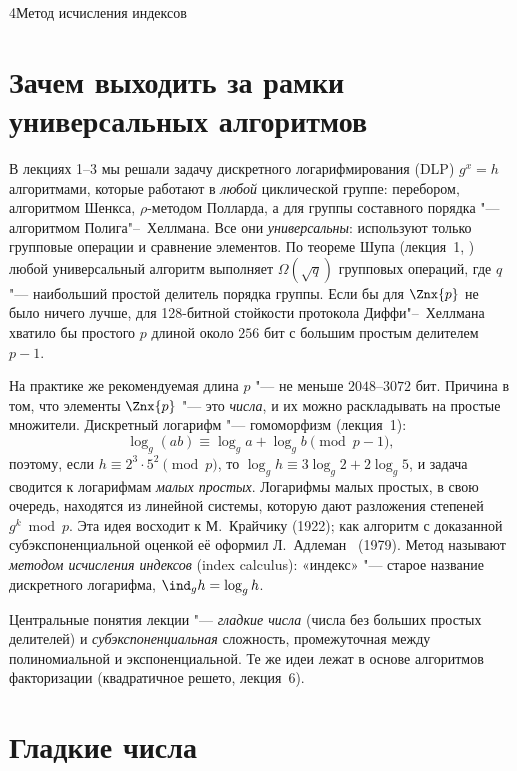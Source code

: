 \begin{lecture}{4}{Метод исчисления индексов}

\section{Зачем выходить за рамки универсальных алгоритмов}

В лекциях 1--3 мы решали задачу дискретного логарифмирования (DLP) $g^x = h$ алгоритмами,
которые работают в \emph{любой} циклической группе: перебором, алгоритмом Шенкса,
$\rho$-методом Полларда, а для группы составного порядка "--- алгоритмом Полига"--~Хеллмана. Все
они \emph{универсальны}: используют только групповые операции и сравнение элементов. По теореме
Шупа (лекция~1, \cite{shoup-generic}) любой универсальный алгоритм выполняет
$\Omega(\sqrt q)$ групповых операций, где $q$ "--- наибольший простой делитель порядка группы.
Если бы для $\Znx{p}$ не было ничего лучше, для 128-битной стойкости протокола Диффи"--~Хеллмана
хватило бы простого $p$ длиной около $256$ бит с большим простым делителем $p - 1$.

На практике же рекомендуемая длина $p$ "--- не меньше $2048$--$3072$ бит. Причина в том, что
элементы $\Znx{p}$ "--- это \emph{числа}, и их можно раскладывать на простые множители.
Дискретный логарифм "--- гомоморфизм (лекция~1):
\[
  \log_g(ab) \equiv \log_g a + \log_g b \pmod{p - 1},
\]
поэтому, если $h \equiv 2^{3} \cdot 5^{2} \pmod p$, то $\log_g h \equiv 3\log_g 2 + 2\log_g 5$, и
задача сводится к логарифмам \emph{малых простых}. Логарифмы малых простых, в свою очередь,
находятся из линейной системы, которую дают разложения степеней $g^k \bmod p$. Эта идея восходит
к М.~Крайчику (1922); как алгоритм с доказанной субэкспоненциальной оценкой её оформил
Л.~Адлеман~\cite{adleman-index-calculus} (1979). Метод называют \emph{методом исчисления
индексов} (index calculus): «индекс» "--- старое название дискретного логарифма,
$\ind_g h = \log_g h$.

Центральные понятия лекции "--- \emph{гладкие числа} (числа без больших простых делителей) и
\emph{субэкспоненциальная} сложность, промежуточная между полиномиальной и экспоненциальной.
Те же идеи лежат в основе алгоритмов факторизации (квадратичное решето, лекция~6).

\section{Гладкие числа}


\end{lecture}
